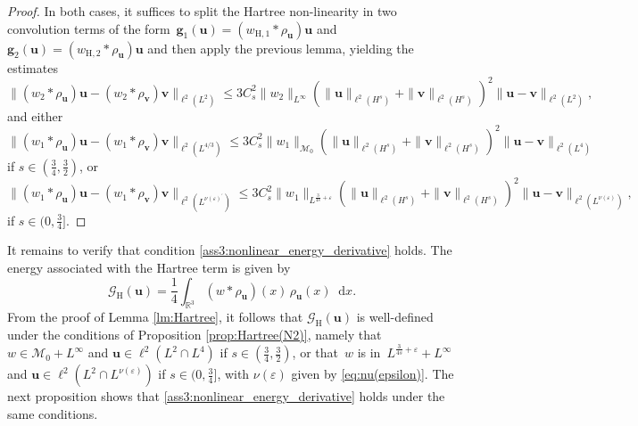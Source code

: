 \documentclass[12pt,a4paper]{amsart}
\numberwithin{equation}{section}
\newcommand{\ulu}{\boldsymbol{u}}
\newcommand{\ulv}{\boldsymbol{v}}
\newcommand{\ulg}{\boldsymbol{g}}
\newcommand*\diff{\mathop{}\!\mathrm{d}}
\begin{document}
	\begin{proof}
		In both cases, it suffices to split the Hartree non-linearity in two convolution terms of the form~$ \ulg_1(\ulu) = (w_{\mathrm{H},1} \ast \rho_{\ulu}) \ulu$ and $\ulg_2(\ulu) = (w_{\mathrm{H},2} \ast \rho_{\ulu}) \ulu $ and then apply the previous lemma, yielding the estimates 
		\begin{equation}    
			\| (w_2 \ast \rho_{\ulu}) \ulu - (w_2 \ast \rho_{\ulv}) \ulv \|_{\ell^2(L^{2})} \leq  3 C_{s}^2 \| w_2 \|_{L^\infty} ( \| \ulu  \|_{\ell^2(H^s)} +\| \ulv \|_{\ell^2(H^s)}  )^2 \| \ulu-\ulv \|_{\ell^2(L^{2})} ,
		\end{equation}
		and either
		\begin{equation}
			\| (w_1 \ast \rho_{\ulu}) \ulu - (w_1 \ast \rho_{\ulv}) \ulv \|_{\ell^2(L^{4/3})} \leq  3 C_{s}^2 \| w_1 \|_{\mathcal{M}_0} ( \| \ulu  \|_{\ell^2(H^s)} +\| \ulv \|_{\ell^2(H^s)}  )^2 \| \ulu-\ulv \|_{\ell^2(L^{4})}
		\end{equation}
		if $s\in(\frac34,\frac32)$, or
		\begin{equation}
			\| (w_1 \ast \rho_{\ulu}) \ulu - (w_1 \ast \rho_{\ulv}) \ulv \|_{\ell^2(L^{\nu(\varepsilon)^\prime})} \leq  3 C_{s}^2 \| w_1 \|_{L^{\frac{3}{4s}+\varepsilon}} ( \| \ulu  \|_{\ell^2(H^s)} +\| \ulv \|_{\ell^2(H^s)}  )^2 \| \ulu-\ulv \|_{\ell^2(L^{\nu(\varepsilon)})} ,\end{equation}
		if $s\in(0,\frac34]$.

	\end{proof}
	It remains to verify that condition \ref{ass3:nonlinear_energy_derivative} holds. The energy associated with the Hartree term is given by
	\begin{equation}
		\mathscr{G}_{\mathrm{H}}(\ulu) = \frac{1}{4} \int_{\mathbb{R}^3} (w \ast \rho_{\ulu})(x) \, \rho_{\ulu}(x) \diff x.
	\end{equation}
	From the proof of Lemma \ref{lm:Hartree}, it follows that $\mathscr{G}_{\mathrm{H}}(\ulu)$ is well-defined under the conditions of Proposition \ref{prop:Hartree(N2)}, namely that $w\in\mathcal{M}_0+L^\infty$ and $\ulu\in \ell^2(L^2\cap L^{4})$ if $s\in(\frac34,\frac32)$, or that~$w$ is in~$L^{\frac{3}{4s}+\varepsilon}+L^\infty$ and $\ulu\in \ell^2(L^2\cap L^{\nu(\varepsilon)})$ if $s\in(0,\frac34]$, with $\nu(\varepsilon)$ given by \eqref{eq:nu(epsilon)}. The next proposition shows that \ref{ass3:nonlinear_energy_derivative} holds under the same conditions.
\end{document}
